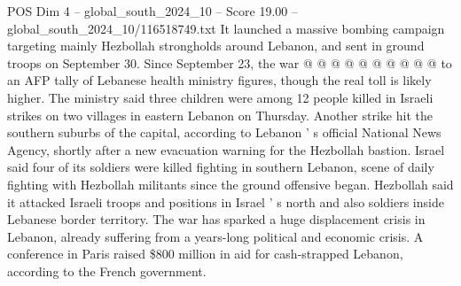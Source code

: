 \begin{textsample}{POS Dim 4 – global\_south\_2024\_10 – Score 19.00 – global\_south\_2024\_10/116518749.txt}
It launched a massive bombing campaign targeting mainly Hezbollah strongholds around Lebanon, and sent in ground troops on September 30.
Since September 23, the war @ @ @ @ @ @ @ @ @ @ to an AFP tally of Lebanese health ministry figures, though the real toll is likely higher.
The ministry said three children were among 12 people killed in Israeli strikes on two villages in eastern Lebanon on Thursday.
Another strike hit the southern suburbs of the capital, according to Lebanon ' s official National News Agency, shortly after a new evacuation warning for the Hezbollah bastion.
Israel said four of its soldiers were killed fighting in southern Lebanon, scene of daily fighting with Hezbollah militants since the ground offensive began.
Hezbollah said it attacked Israeli troops and positions in Israel ' s north and also soldiers inside Lebanese border territory.
The war has sparked a huge displacement crisis in Lebanon, already suffering from a years-long political and economic crisis.
A conference in Paris raised \$800 million in aid for cash-strapped Lebanon, according to the French government.

\end{textsample}

